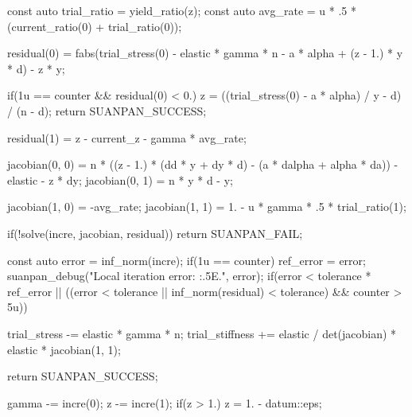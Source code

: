 \begin{cppcode}
{{        const auto trial_ratio = yield_ratio(z);
        const auto avg_rate = u * .5 * (current_ratio(0) + trial_ratio(0));

        residual(0) = fabs(trial_stress(0) - elastic * gamma * n - a * alpha + (z - 1.) * y * d) - z * y;

        if(1u == counter && residual(0) < 0.) {
            z = ((trial_stress(0) - a * alpha) / y - d) / (n - d);
            return SUANPAN_SUCCESS;
        }

        residual(1) = z - current_z - gamma * avg_rate;

        jacobian(0, 0) = n * ((z - 1.) * (dd * y + dy * d) - (a * dalpha + alpha * da)) - elastic - z * dy;
        jacobian(0, 1) = n * y * d - y;

        jacobian(1, 0) = -avg_rate;
        jacobian(1, 1) = 1. - u * gamma * .5 * trial_ratio(1);

        if(!solve(incre, jacobian, residual)) return SUANPAN_FAIL;

        const auto error = inf_norm(incre);
        if(1u == counter) ref_error = error;
        suanpan_debug("Local iteration error: {:.5E}.\n", error);
        if(error < tolerance * ref_error || ((error < tolerance || inf_norm(residual) < tolerance) && counter > 5u)) {
            trial_stress -= elastic * gamma * n;
            trial_stiffness += elastic / det(jacobian) * elastic * jacobian(1, 1);

            return SUANPAN_SUCCESS;
        }

        gamma -= incre(0);
        z -= incre(1);
        if(z > 1.) z = 1. - datum::eps;
    }
}
\end{cppcode}
